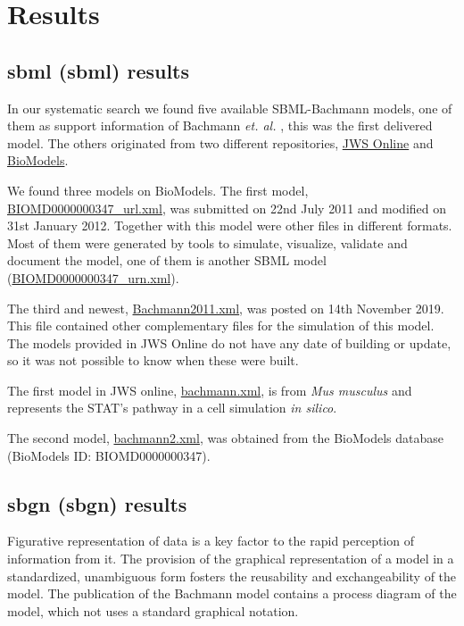 \section*{Results} \label{sec:resuslt}
\subsection*{\acl{sbml} (\ac{sbml}) results}
In our systematic search we found five available SBML-Bachmann models, one of them as support information of Bachmann \textit{et. al.} \cite{bachmannmodel}, this was the first delivered model. The others originated  from two different repositories, \hyperlink{https://www.systemsmedicine.net/posts/jws-online-biological-systems-modelling}{JWS Online} and \hyperlink{https://www.ebi.ac.uk/biomodels/}{BioModels}.

We found three models on BioModels. The first model, \hyperlink{https://www.ebi.ac.uk/biomodels/model/download/BIOMD0000000347.2?filename=BIOMD0000000347_url.xml}{\textsf{BIOMD0000000347\_url.xml}}, was submitted on 22nd July 2011 and modified on 31st January 2012. Together with this model were other files in different formats. Most of them were generated by tools to simulate, visualize, validate and document the model, one of them is another SBML model (\hyperlink{https://www.ebi.ac.uk/biomodels/model/download/BIOMD0000000347.2?filename=BIOMD0000000347_url.xml}{\textsf{BIOMD0000000347\_urn.xml}}). 

The third and newest, \hyperlink{https://www.ebi.ac.uk/biomodels/model/download/BIOMD0000000861.2?filename=Bachmann2011.xml}{\textsf{Bachmann2011.xml}}, was posted on 14th November 2019. This file contained other complementary files for the simulation of this model. The models provided in JWS Online do not have any date of building or update, so it was not possible to know when these were built. 

The first model in JWS online, \hyperlink{https://jjj.bio.vu.nl/models/bachmann/sbml/?download=1}{\textsf{bachmann.xml}}, is from \textit{Mus musculus} and represents the STAT's pathway in a cell simulation \textit{in silico}. 

The second model, \hyperlink{https://jjj.bio.vu.nl/models/bachmann2/sbml/?download=1}{\textsf{bachmann2.xml}}, was obtained from the BioModels database (BioModels ID: BIOMD0000000347).

\subsection*{\acl{sbgn} (\ac{sbgn}) results}
Figurative representation of data is a key factor to the rapid perception of information from it. The provision of the graphical representation of a model in a standardized, unambiguous form fosters the reusability and exchangeability of the model. The publication of the Bachmann model contains a process diagram of the model, which not uses a standard graphical notation.

